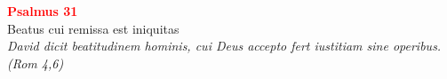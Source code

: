 


\def\greinitialformat#1{%
{\fontsize{39}{39}\selectfont #1}%
}




\vspace{0.3cm}
\begin{center}
 \textcolor{red}{\large \bf Psalmus 31}\\
Beatus cui remissa est iniquitas\\
\textit{\small David dicit beatitudinem hominis, cui Deus accepto fert iustitiam sine operibus. (Rom 4,6)}
\end{center}

